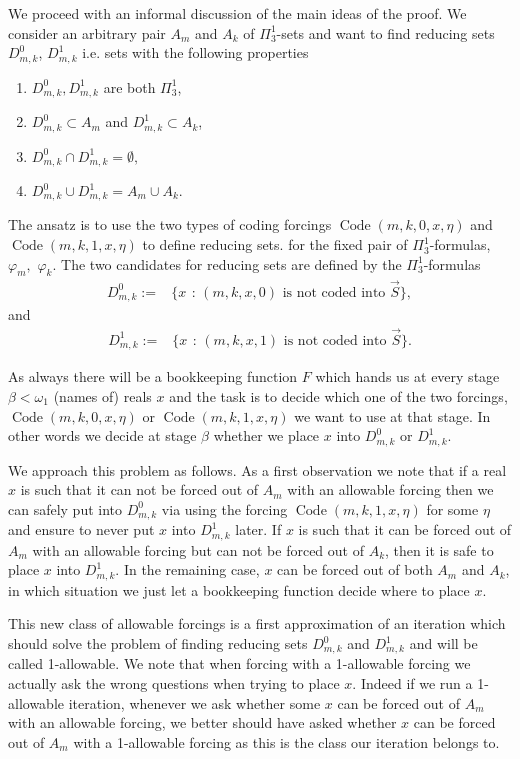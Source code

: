 \documentclass[a4paper,11pt]{article}
\begin{document}
We proceed with an informal discussion of the main ideas of the proof. We consider an   arbitrary pair $A_m$ and $A_k$ of $\Pi^1_3$-sets and want to find reducing sets $D^0_{m,k}$, $D^1_{m,k}$ i.e. sets with the following properties
\begin{enumerate}
\item $D^0_{m,k} ,D^1_{m,k}$ are both $\Pi^1_3$,
\item $D^0_{m,k} \subset A_m$ and $D^1_{m,k} \subset A_k$,
\item $D^0_{m,k} \cap D^1_{m,k} = \emptyset,$
\item $D^0_{m,k} \cup D^1_{m,k} = A_m \cup A_k$.
\end{enumerate}


The ansatz is to use the two types of coding forcings $\operatorname{Code} (m,k,0,x,\eta)$ and $\operatorname{Code} (m,k,1,x,\eta)$ to define reducing sets. for the fixed pair of  $\Pi^1_3$-formulas, $\varphi_m,$  $\varphi_k$.
The two candidates for reducing sets are defined by the $\Pi^1_3$-formulas
 \begin{align*}
D^0_{m,k}:= & \{ x \   \, : \, (m,k,x,0) \text{ is  not coded into $\vec{S}$} \}  ,
\end{align*}
and 
 \begin{align*}
D^1_{m,k}:= & \{ x \ \, : \, (m,k,x,1) \text{ is  not coded into $\vec{S}$} \}  .
\end{align*}

 As always there will be  a bookkeeping function $F$ which hands us at every stage $\beta< \omega_1$ (names of) reals  $x$ and the task is to decide which one of the two forcings, $\operatorname{Code} (m,k,0,x,\eta)$  or $\operatorname{Code} (m,k,1,x,\eta)$ we want to use  at that stage.  In other words we decide at stage $\beta$ whether we place $x$ into $D^0_{m,k}$ or $D^1_{m,k}$.

We approach this problem as follows. As a first observation we note that if a real $x$ is such that it can not be forced out of $A_m$ with an allowable forcing then we can safely put into $D^0_{m,k}$ via using the forcing $\operatorname{Code} (m,k,1,x,\eta)$ for some $\eta$ and ensure to never put $x$ into $D^1_{m,k}$ later. If $x$ is such that it can be forced out of $A_m$ with an allowable forcing but can not be forced out of $A_k$, then it is safe to place $x$ into $D^1_{m,k}$. In the remaining case, $x$ can be forced out of both $A_m$ and $A_k$, in which situation we just let a bookkeeping function decide where to place $x$. 

This new class of allowable forcings is a first approximation of an iteration which should solve the problem of finding reducing sets $D^0_{m,k}$ and $D^1_{m,k}$ and will be called 1-allowable. We note that when forcing with a 1-allowable forcing we actually ask the wrong questions when trying to place $x$.
Indeed if we run a 1-allowable iteration, whenever we ask whether some $x$ can be forced out of $A_m$ with an allowable forcing, we better should have asked whether $x$ can be forced out of $A_m$ with a 1-allowable forcing as this is the class our iteration belongs to.
\end{document}
